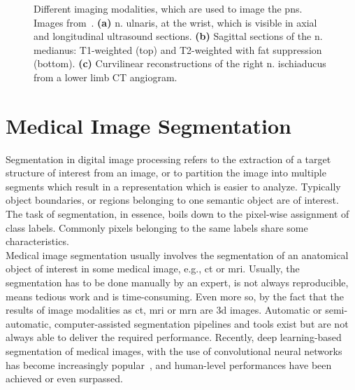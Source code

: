 \begin{figure}[htbp]
	\centering
	\hfill
	\hfill
	\caption[Modalities for Imaging of the Peripheral Nervous System]{Different imaging modalities, which are used to image the \acrlong{pns}. Images from~\cite{Mohassel2015}. \textbf{(a)} \gls{n.} ulnaris, at the wrist, which is visible in axial and longitudinal ultrasound sections. \textbf{(b)} Sagittal sections of the \gls{n.} medianus: T1-weighted (top) and T2-weighted with fat suppression (bottom). \textbf{(c)} Curvilinear reconstructions of the right \gls{n.} ischiaducus from a lower limb CT angiogram.}
	\label{fig:imag_modalities}  
\end{figure}

\section{Medical Image Segmentation} \label{sec:intro_mia} %
Segmentation in digital image processing refers to the extraction of a target structure of interest from an image, or to partition the image into multiple segments which result in a representation which is easier to analyze. Typically object boundaries, or regions belonging to one semantic object are of interest. The task of segmentation, in essence, boils down to the pixel-wise assignment of class labels. Commonly pixels belonging to the same labels share some characteristics.\\
Medical image segmentation usually involves the segmentation of an anatomical object of interest in some medical image, e.g., \gls{ct} or \gls{mri}. Usually, the segmentation has to be done manually by an expert, is not always reproducible, means tedious work and is time-consuming. Even more so, by the fact that the results of image modalities as \gls{ct}, \gls{mri} or \gls{mrn} are \gls{3d} images. Automatic or semi-automatic, computer-assisted segmentation pipelines and tools exist but are not always able to deliver the required performance. Recently, deep learning-based segmentation of medical images, with the use of convolutional neural networks has become increasingly popular~\cite{Ronneberger2015U-Net:Segmentation,Tetteh2018DeepVesselNet:Volumes,Cicek20163DAnnotation,Baumgartner2017AnSegmentation,Meng2017TrackingNetwork,Milletari2016V-Net:Segmentation,BalsigerContext-awareNeurography,Kayalibay2017CNN-basedData}, and human-level performances have been achieved or even surpassed.

